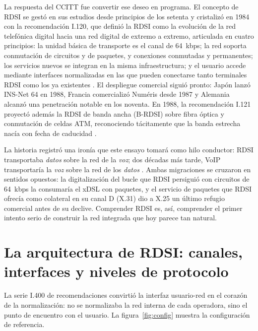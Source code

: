 \documentclass[12pt,a4paper]{article}
\begin{document}
La respuesta del CCITT fue convertir ese deseo en programa. El concepto de RDSI se gestó en sus estudios desde principios de los setenta y cristalizó en 1984 con la recomendación I.120, que definió la RDSI como la evolución de la red telefónica digital hacia una red digital de extremo a extremo, articulada en cuatro principios: la unidad básica de transporte es el canal de 64~kbps; la red soporta conmutación de circuitos y de paquetes, y conexiones conmutadas y permanentes; los servicios nuevos se integran en la misma infraestructura; y el usuario accede mediante interfaces normalizadas en las que pueden conectarse tanto terminales RDSI como los ya existentes \cite{itui120, stallings1999}. El despliegue comercial siguió pronto: Japón lanzó INS-Net 64 en 1988, Francia comercializó Numéris desde 1987 y Alemania alcanzó una penetración notable en los noventa. En 1988, la recomendación I.121 proyectó además la RDSI de banda ancha (B-RDSI) sobre fibra óptica y conmutación de celdas ATM, reconociendo tácitamente que la banda estrecha nacía con fecha de caducidad \cite{itui121}.

La historia registró una ironía que este ensayo tomará como hilo conductor: RDSI transportaba \emph{datos} sobre la red de la \emph{voz}; dos décadas más tarde, VoIP transportaría la \emph{voz} sobre la red de los \emph{datos} \cite{werbach2014}. Ambas migraciones se cruzaron en sentidos opuestos: la digitalización del bucle que RDSI persiguió con circuitos de 64~kbps la consumaría el xDSL con paquetes, y el servicio de paquetes que RDSI ofrecía como colateral en su canal D (X.31) dio a X.25 un último refugio comercial antes de su declive. Comprender RDSI es, así, comprender el primer intento serio de construir la red integrada que hoy parece tan natural.

\section{La arquitectura de RDSI: canales, interfaces y niveles de protocolo}

La serie I.400 de recomendaciones convirtió la interfaz usuario-red en el corazón de la normalización: no se normalizaba la red interna de cada operadora, sino el punto de encuentro con el usuario. La figura~\ref{fig:config} muestra la configuración de referencia.
\end{document}
